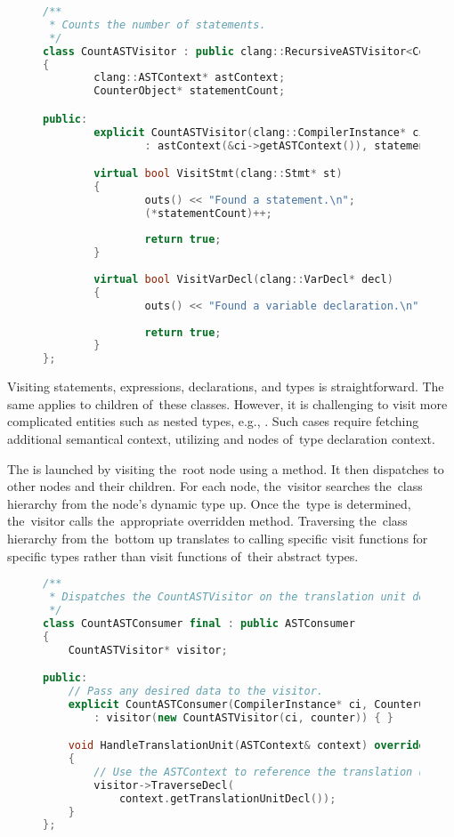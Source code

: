 \begin{figure}[ht]\centering
\begin{lstlisting}[caption=CountASTVisitor., language=C++, 
label={lst:countvisitor}]
/**
 * Counts the number of statements.
 */
class CountASTVisitor : public clang::RecursiveASTVisitor<CountASTVisitor>
{
        clang::ASTContext* astContext;
        CounterObject* statementCount;

public:
        explicit CountASTVisitor(clang::CompilerInstance* ci, CounterObject* counter)
                : astContext(&ci->getASTContext()), statementCount(counter) { }

        virtual bool VisitStmt(clang::Stmt* st)
        {
                outs() << "Found a statement.\n";
				(*statementCount)++;
				
                return true;
        }
		
		virtual bool VisitVarDecl(clang::VarDecl* decl)
        {
                outs() << "Found a variable declaration.\n";
				
                return true;
        }
};
\end{lstlisting}
\end{figure}

Visiting statements, expressions, declarations, 
and types is straightforward. 
The same applies to children of~these classes. 
However, it is challenging to visit more complicated entities 
such as nested types, e.g., . 
Such cases require fetching additional semantical context, 
utilizing  and nodes of~type declaration context.


The  is launched by visiting the~root node using 
a  method. 
It then dispatches to other nodes and their children. 
For each node, the~visitor searches the~class hierarchy from 
the node's dynamic type up. 
Once the~type is determined, the~visitor calls the~appropriate 
overridden  method. 
Traversing the~class hierarchy from the~bottom up 
translates to calling specific visit functions for specific types 
rather than visit functions of~their abstract types.

\begin{figure}[ht]\centering
\begin{lstlisting}[caption=ASTConsumer., language=C++, 
label={lst:astconsumer}]
/**
 * Dispatches the CountASTVisitor on the translation unit decl.
 */
class CountASTConsumer final : public ASTConsumer
{
	CountASTVisitor* visitor;

public:
	// Pass any desired data to the visitor.
	explicit CountASTConsumer(CompilerInstance* ci, CounterObject* counter)
		: visitor(new CountASTVisitor(ci, counter)) { }

	void HandleTranslationUnit(ASTContext& context) override
	{
		// Use the ASTContext to reference the translation unit decl.
		visitor->TraverseDecl(
			context.getTranslationUnitDecl());
	}
};
\end{lstlisting}
\end{figure}

